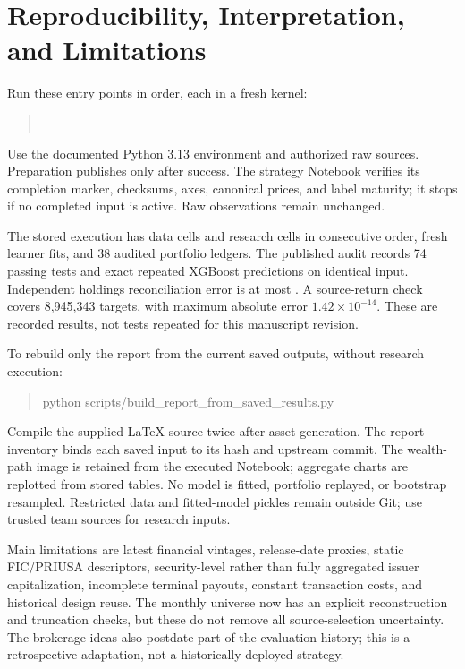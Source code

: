 \documentclass[11pt]{article}
\begin{document}
\section{Reproducibility, Interpretation, and Limitations}
Run these entry points in order, each in a fresh kernel:
\begin{quote}\small
{}\\
\end{quote}
Use the documented Python 3.13 environment and authorized raw sources. Preparation publishes  only after success. The strategy Notebook verifies its completion marker, checksums, axes, canonical prices, and label maturity; it stops if no completed input is active. Raw observations remain unchanged.

The stored execution has \DataCodeCells{} data cells and \CodeCells{} research cells in consecutive order, \FitCount{} fresh learner fits, and 38 audited portfolio ledgers. The published audit records 74 passing tests and exact repeated XGBoost predictions on identical input. Independent holdings reconciliation error is at most \texttt{\LedgerError}. A source-return check covers 8,945,343 targets, with maximum absolute error $1.42\times10^{-14}$. These are recorded results, not tests repeated for this manuscript revision.

To rebuild only the report from the current saved outputs, without research execution:
\begin{quote}\small\ttfamily
python scripts/build\_report\_from\_saved\_results.py
\end{quote}
Compile the supplied LaTeX source twice after asset generation. The report inventory binds each saved input to its hash and upstream commit. The wealth-path image is retained from the executed Notebook; aggregate charts are replotted from stored tables. No model is fitted, portfolio replayed, or bootstrap resampled. Restricted data and fitted-model pickles remain outside Git; use trusted team sources for research inputs.

Main limitations are latest financial vintages, release-date proxies, static FIC/PRIUSA descriptors, security-level rather than fully aggregated issuer capitalization, incomplete terminal payouts, constant transaction costs, and historical design reuse. The monthly universe now has an explicit reconstruction and truncation checks, but these do not remove all source-selection uncertainty. The brokerage ideas also postdate part of the evaluation history; this is a retrospective adaptation, not a historically deployed strategy.
\end{document}
